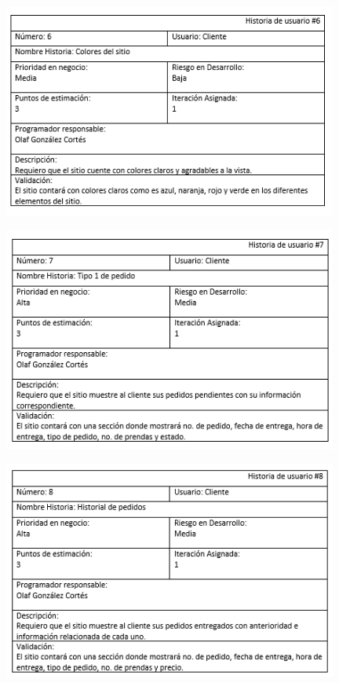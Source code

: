 \begin{figure}[htb]
\begin{center}
\includegraphics[width=11cm]{./imagenes/tablas/HU6.png}
\end{center}

\end{figure}

\newpage

\begin{figure}[htb]
\begin{center}
\includegraphics[width=11cm]{./imagenes/tablas/HU7.png}
\end{center}

\end{figure}



\begin{figure}[htb]
\begin{center}
\includegraphics[width=11cm]{./imagenes/tablas/HU8.png}
\end{center}

\end{figure}
\newpage


